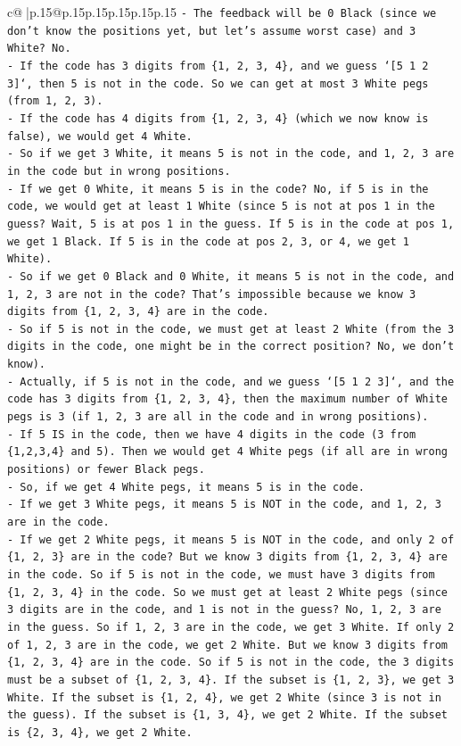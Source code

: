 \documentclass{article}
\begin{document}
{\begin{supertabular}{c@{$\;$}|p{.15\linewidth}@{}p{.15\linewidth}p{.15\linewidth}p{.15\linewidth}p{.15\linewidth}p{.15\linewidth}}
{{{\texttt{{-} The feedback will be 0 Black (since we don't know the positions yet, but let's assume worst case) and 3 White? No.} \\
\texttt{{-} If the code has 3 digits from \{1, 2, 3, 4\}, and we guess `{[}5 1 2 3{]}`, then 5 is not in the code. So we can get at most 3 White pegs (from 1, 2, 3).} \\
\texttt{{-} If the code has 4 digits from \{1, 2, 3, 4\} (which we now know is false), we would get 4 White.} \\
\texttt{{-} So if we get 3 White, it means 5 is not in the code, and 1, 2, 3 are in the code but in wrong positions.} \\
\texttt{{-} If we get 0 White, it means 5 is in the code? No, if 5 is in the code, we would get at least 1 White (since 5 is not at pos 1 in the guess? Wait, 5 is at pos 1 in the guess. If 5 is in the code at pos 1, we get 1 Black. If 5 is in the code at pos 2, 3, or 4, we get 1 White).} \\
\texttt{{-} So if we get 0 Black and 0 White, it means 5 is not in the code, and 1, 2, 3 are not in the code? That's impossible because we know 3 digits from \{1, 2, 3, 4\} are in the code.} \\
\texttt{{-} So if 5 is not in the code, we must get at least 2 White (from the 3 digits in the code, one might be in the correct position? No, we don't know).} \\
\texttt{{-} Actually, if 5 is not in the code, and we guess `{[}5 1 2 3{]}`, and the code has 3 digits from \{1, 2, 3, 4\}, then the maximum number of White pegs is 3 (if 1, 2, 3 are all in the code and in wrong positions).} \\
\texttt{{-} If 5 IS in the code, then we have 4 digits in the code (3 from \{1,2,3,4\} and 5). Then we would get 4 White pegs (if all are in wrong positions) or fewer Black pegs.} \\
\texttt{{-} So, if we get 4 White pegs, it means 5 is in the code.} \\
\texttt{{-} If we get 3 White pegs, it means 5 is NOT in the code, and 1, 2, 3 are in the code.} \\
\texttt{{-} If we get 2 White pegs, it means 5 is NOT in the code, and only 2 of \{1, 2, 3\} are in the code? But we know 3 digits from \{1, 2, 3, 4\} are in the code. So if 5 is not in the code, we must have 3 digits from \{1, 2, 3, 4\} in the code. So we must get at least 2 White pegs (since 3 digits are in the code, and 1 is not in the guess? No, 1, 2, 3 are in the guess. So if 1, 2, 3 are in the code, we get 3 White. If only 2 of 1, 2, 3 are in the code, we get 2 White. But we know 3 digits from \{1, 2, 3, 4\} are in the code. So if 5 is not in the code, the 3 digits must be a subset of \{1, 2, 3, 4\}. If the subset is \{1, 2, 3\}, we get 3 White. If the subset is \{1, 2, 4\}, we get 2 White (since 3 is not in the guess). If the subset is \{1, 3, 4\}, we get 2 White. If the subset is \{2, 3, 4\}, we get 2 White.} \\
}}}
\end{supertabular}}
\end{document}

